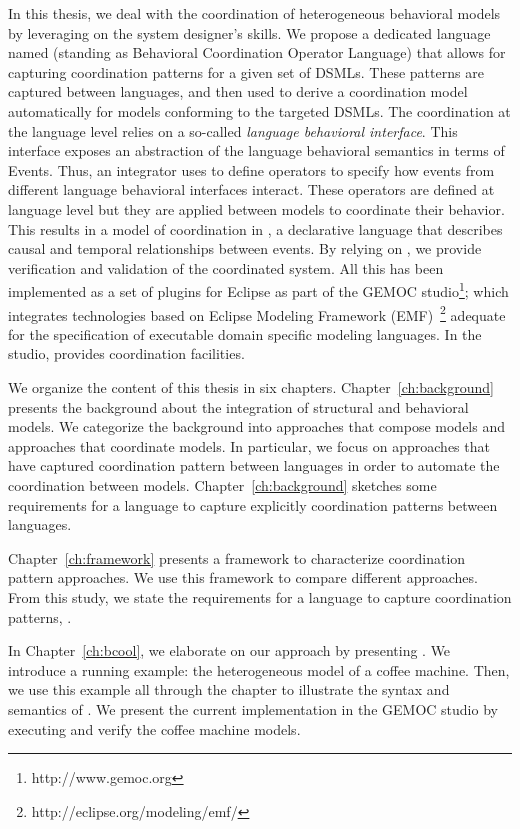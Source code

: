In this thesis, we deal with the coordination of heterogeneous behavioral models by leveraging on the system designer's skills. We propose a dedicated language named \bcool (standing as Behavioral Coordination Operator Language) that allows for capturing coordination patterns for a given set of DSMLs. These patterns are captured between languages, and then used to derive a coordination model automatically for models conforming to the targeted DSMLs. The coordination at the language level relies on a so-called \emph{language behavioral interface}. This interface exposes an abstraction of the language behavioral semantics in terms of Events. Thus, an integrator uses \bcool to define operators to specify how events from different language behavioral interfaces interact. These operators are defined at language level but they are applied between models to coordinate their behavior. This results in a model of coordination in \ccsl, a declarative language that describes causal and temporal relationships between events. By relying on \ccsl, we provide verification and validation of the coordinated system. All this has been implemented as a set of plugins for Eclipse as part of the GEMOC studio\footnote{http://www.gemoc.org}; which integrates technologies based on Eclipse Modeling Framework (EMF)~\footnote{http://eclipse.org/modeling/emf/} adequate for the specification of executable domain specific modeling languages. In the studio, \bcool provides coordination facilities.   

We organize the content of this thesis in six chapters. Chapter~\ref{ch:background} presents the background about the integration of structural and behavioral models. We categorize the background into approaches that compose models and approaches that coordinate models. In particular, we focus on approaches that have captured coordination pattern between languages in order to automate the coordination between models. Chapter~\ref{ch:background} sketches some requirements for a language to capture explicitly coordination patterns between languages.    

Chapter~\ref{ch:framework} presents a framework to characterize coordination pattern approaches. We use this framework to compare different approaches. From this study, we state the requirements for a language to capture coordination patterns, \ie \bcool.  

In Chapter~\ref{ch:bcool}, we elaborate on our approach by presenting \bcool. We introduce a running example: the heterogeneous model of a coffee machine. Then, we use this example all through the chapter to illustrate the syntax and semantics of \bcool. We present the current implementation in the GEMOC studio by executing and verify the coffee machine models. 

